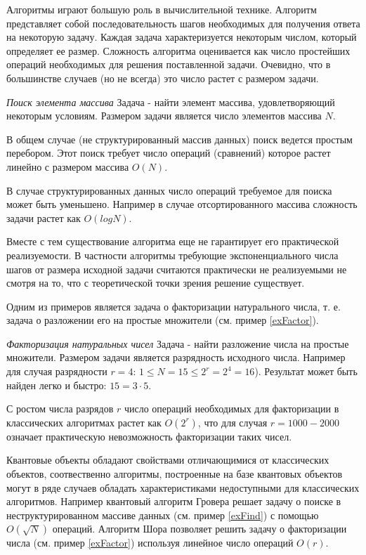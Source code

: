 Алгоритмы играют большую роль в вычислительной технике. Алгоритм
представляет собой последовательность шагов необходимых для получения
ответа на некоторую задачу. Каждая задача характеризуется некоторым
числом, который определяет ее размер. Сложность алгоритма оценивается
как число 
простейших операций необходимых для решения поставленной
задачи. Очевидно, что в большинстве случаев (но не всегда) это число
растет с размером задачи. 

\begin{example}
\emph{Поиск элемента массива}
\label{exFind}
Задача - найти элемент массива, удовлетворяющий некоторым
условиям. Размером задачи является число элементов массива $N$. 

В общем случае (не структурированный массив данных) поиск ведется
простым перебором. Этот поиск требует число операций (сравнений) которое
растет линейно с размером массива $O\left( N \right)$.

В случае структурированных данных число операций требуемое для поиска
может быть уменьшено. Например в случае отсортированного массива
сложность задачи растет как $O\left(log N\right)$.
\end{example}

Вместе с тем существование алгоритма еще
не гарантирует его практической реализуемости. В частности алгоритмы
требующие экспоненциального числа шагов от размера исходной задачи
считаются практически не реализуемыми не смотря на то, что с
теоретической точки зрения решение существует.

Одним из примеров является задача о факторизации натурального числа,
т. е. задача о разложении его на простые множители (см. пример
\ref{exFactor}).  

\begin{example}
\emph{Факторизация натуральных чисел}
\label{exFactor}
Задача - найти разложение числа на простые множители.
Размером задачи
является разрядность исходного числа. Например для случая разрядности
$r = 4$: $1 \le N = 15 \le 2^r = 2^4 = 16$). Результат может быть
найден легко и быстро: $15 = 3 \cdot 5$. 

С ростом числа разрядов $r$ число операций необходимых для
факторизации в классических алгоритмах растет как
$O\left(2^r\right)$, что для случая $r = 1000 - 2000$ означает практическую
невозможность факторизации таких чисел. 
\end{example}

Квантовые объекты обладают свойствами отличающимися от классических
объектов, соотвественно алгоритмы, построенные на базе квантовых
объектов могут в ряде случаев обладать характеристиками недоступными
для классических алгоритмов. Например квантовый алгоритм Гровера
\cite{Grover96afast} решает задачу о поиске в неструктурированном
массиве данных (см. пример \ref{exFind}) с помощью
$O\left(\sqrt{N}\right)$ операций. Алгоритм Шора \cite{bShor94}
позволяет решить задачу о факторизации числа (см. пример
\ref{exFactor}) используя линейное число операций $O\left(r\right)$. 
